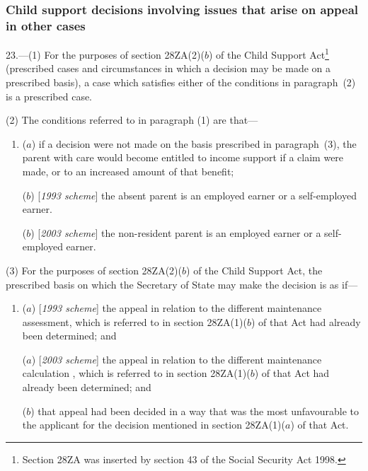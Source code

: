 \documentclass[12pt,a4paper]{article}
\begin{document}

\subsubsection[23. Child support decisions involving issues that arise on appeal in other cases]{Child support decisions involving issues that arise on appeal in other cases}

23.—(1) For the purposes of section 28ZA(2)($b$) of the Child Support Act\footnote{\frenchspacing Section 28ZA was inserted by section 43 of the Social Security Act 1998.} (prescribed cases and circumstances in which a decision may be made on a prescribed basis), a case which satisfies either of the conditions in paragraph~(2) is a prescribed case.

(2) The conditions referred to in paragraph (1) are that—
\begin{enumerate}\item[]
($a$) if a decision were not made on the basis prescribed in paragraph~(3), the parent with care would become entitled to income support if a claim were made, or to an increased amount of that benefit;

($b$) [\emph{1993 scheme}] the absent parent is an employed earner or a self-employed earner.

($b$) [\emph{2003 scheme}] the 
non-resident parent  %
is an employed earner or a self-employed earner.
\end{enumerate}

(3) For the purposes of section 28ZA(2)($b$) of the Child Support Act, the prescribed basis on which the 
Secretary of State %
may make the decision is as if—
\begin{enumerate}\item[]
($a$) [\emph{1993 scheme}] the appeal in relation to the different maintenance assessment, which is referred to in section 28ZA(1)($b$) of that Act had already been determined; and

($a$) [\emph{2003 scheme}] the appeal in relation to the different maintenance 
calculation%
, which is referred to in section 28ZA(1)($b$) of that Act had already been determined; and

($b$) that appeal had been decided in a way that was the most unfavourable to the applicant for the decision mentioned in section 28ZA(1)($a$) of that Act.
\end{enumerate}
\end{document}
